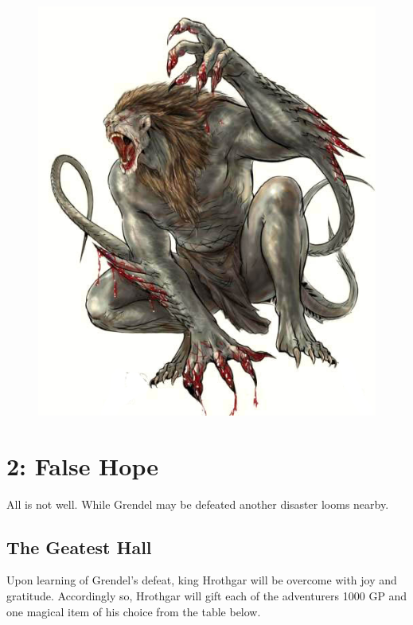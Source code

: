 \documentclass[10pt,twoside,twocolumn,openany]{book}
\begin{document}
\begin{figure}

	\vspace{-4.5cm}
	
	\centerline{
		\includegraphics[scale=1]{grendel}
	}
\end{figure}


\clearpage

\chapter{2: False Hope}

All is not well. While Grendel may be defeated another disaster looms nearby.

\section{The Geatest Hall}
Upon learning of Grendel's defeat, king Hrothgar will be overcome with joy and gratitude. Accordingly so, Hrothgar will gift each of the adventurers 1000 GP and one magical item of his choice from the table below.
\end{document}
